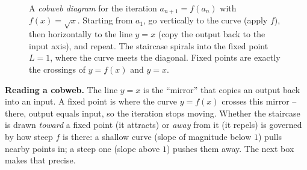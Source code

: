 \begin{figure}[H]
\centering
{}
\caption{A \emph{cobweb diagram} for the iteration $a_{n+1} = f(a_n)$ with
$f(x)=\sqrt{x}$. Starting from $a_1$, go vertically to the curve (apply $f$),
then horizontally to the line $y=x$ (copy the output back to the input axis), and
repeat. The staircase spirals into the fixed point $L=1$, where the curve meets
the diagonal. Fixed points are exactly the crossings of $y=f(x)$ and $y=x$.}
\label{ch28:fig-cobweb}
\end{figure}

\begin{intuitionbox}
\textbf{Reading a cobweb.} The line $y = x$ is the ``mirror'' that copies an
output back into an input. A fixed point is where the curve $y = f(x)$ crosses
this mirror -- there, output equals input, so the iteration stops moving. Whether
the staircase is drawn \emph{toward} a fixed point (it attracts) or \emph{away}
from it (it repels) is governed by how steep $f$ is there: a shallow curve
(slope of magnitude below $1$) pulls nearby points in; a steep one (slope above
$1$) pushes them away. The next box makes that precise.
\end{intuitionbox}

